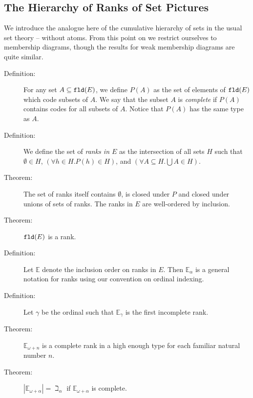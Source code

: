 \documentclass[12pt]{book}
\begin{document}
\newpage


\subsection{The Hierarchy of Ranks of Set Pictures}

We introduce the analogue here of the cumulative hierarchy of sets in
the usual set theory -- without atoms.  From this point on we restrict
ourselves to membership diagrams, though the results for weak
membership diagrams are quite similar.

\begin{description}

\item[Definition:] For any set $A \subseteq {\tt fld}(E)$, we define $P(A)$
as the set of elements of ${\tt fld}(E)$ which code subsets of $A$.
We say that the subset $A$ is {\em complete\/} if $P(A)$ contains
codes for all subsets of $A$.  Notice that $P(A)$ has the same type as
$A$.

\item[Definition:]  We define the set of {\em ranks in $E$\/} as the intersection of all sets $H$ such that $\emptyset \in H$, $(\forall h \in H.P(h) \in H)$,
and $(\forall A \subseteq H.\bigcup A \in H)$.

\item[Theorem:] The set of ranks itself contains $\emptyset$, is
closed under $P$ and closed under unions of sets of ranks.  The ranks
in $E$ are well-ordered by inclusion.

\item[Theorem:]  ${\tt fld}(E)$ is a rank.

\item[Definition:] Let $\mathbb E$ denote the inclusion order on ranks
in $E$. Then ${\mathbb E}_{\alpha}$ is a general notation for ranks
using our convention on ordinal indexing.

\item[Definition:] Let $\gamma$ be the ordinal such that ${\mathbb
E}_{\gamma}$ is the first incomplete rank.

\item[Theorem:] ${\mathbb E}_{\omega+n}$ is a complete rank in a high enough
type for each familiar natural number $n$.

\item[Theorem:]  $|{\mathbb E}_{\omega + \alpha}| = \beth_{\alpha}$ if
${\mathbb E}_{\omega + \alpha}$ is complete.

\end{description}
\end{document}
